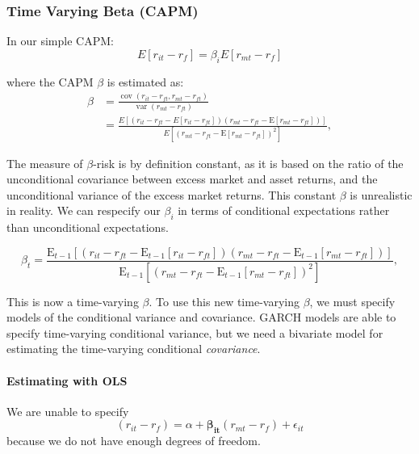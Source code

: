 \documentclass[11pt]{article}
\begin{document}
\subsubsection{Time Varying Beta (CAPM)}

In our simple CAPM:
\[E[r_{it} - r_f] = \beta_i E[r_{mt}-r_f]\]

where the CAPM $\beta$ is estimated as:
\begin{equation}
\begin{aligned}
\beta & =\frac{\operatorname{cov}\left(r_{i t}-r_{f t}, r_{m t}-r_{f t}\right)}{\operatorname{var}\left(r_{m t}-r_{f t}\right)} \\
& =\frac{E\left[\left(r_{i t}-r_{f t}-E\left[r_{i t}-r_{f t}\right]\right)\left(r_{m t}-r_{f t}-\mathrm{E}\left[r_{m t}-r_{f t}\right]\right)\right]}{E\left[\left(r_{m t}-r_{f t}-\mathrm{E}\left[r_{m t}-r_{f t}\right]\right)^2\right]},
\end{aligned}
\end{equation}

The measure of $\beta$-risk is by definition constant, as it is based on the ratio of the unconditional covariance between excess market and asset returns, and the unconditional variance of the excess market returns. This constant $\beta$ is unrealistic in reality. We can respecify our $\beta_i$ in terms of conditional expectations rather than unconditional expectations. 

\begin{equation}
\beta_t=\frac{\mathrm{E}_{t-1}\left[\left(r_{i t}-r_{f t}-\mathrm{E}_{t-1}\left[r_{i t}-r_{f t}\right]\right)\left(r_{m t}-r_{f t}-\mathrm{E}_{t-1}\left[r_{m t}-r_{f t}\right]\right)\right]}{\mathrm{E}_{t-1}\left[\left(r_{m t}-r_{f t}-\mathrm{E}_{t-1}\left[r_{m t}-r_{f t}\right]\right)^2\right]},
\end{equation}

This is now a time-varying $\beta$. To use this new time-varying $\beta$, we must specify models of the conditional variance and covariance. GARCH models are able to specify time-varying conditional variance, but we need a bivariate model for estimating the time-varying conditional \textit{covariance}.

\paragraph{Estimating with OLS}

We are unable to specify
\[(r_{it}-r_{f}) = \alpha + \boldsymbol{\beta_{it}} (r_{mt}-r_f) + \epsilon_{it}\]
because we do not have enough degrees of freedom.
\end{document}
